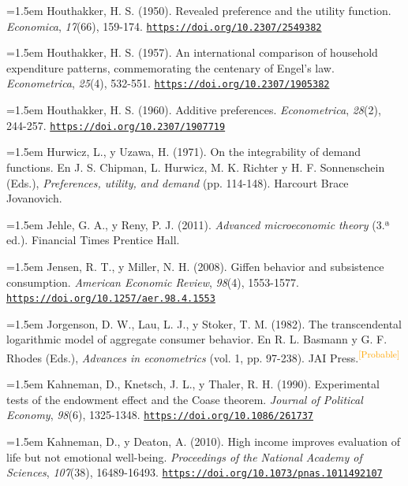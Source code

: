 \documentclass[10pt,a4paper]{article}
\begin{document}
\noindent\hangindent=1.5em Houthakker, H. S. (1950). Revealed preference and the utility function. \textit{Economica}, \textit{17}(66), 159-174. \href{https://doi.org/10.2307/2549382}{\nolinkurl{https://doi.org/10.2307/2549382}}

\noindent\hangindent=1.5em Houthakker, H. S. (1957). An international comparison of household expenditure patterns, commemorating the centenary of Engel's law. \textit{Econometrica}, \textit{25}(4), 532-551. \href{https://doi.org/10.2307/1905382}{\nolinkurl{https://doi.org/10.2307/1905382}}

\noindent\hangindent=1.5em Houthakker, H. S. (1960). Additive preferences. \textit{Econometrica}, \textit{28}(2), 244-257. \href{https://doi.org/10.2307/1907719}{\nolinkurl{https://doi.org/10.2307/1907719}}

\noindent\hangindent=1.5em Hurwicz, L., y Uzawa, H. (1971). On the integrability of demand functions. En J. S. Chipman, L. Hurwicz, M. K. Richter y H. F. Sonnenschein (Eds.), \textit{Preferences, utility, and demand} (pp. 114-148). Harcourt Brace Jovanovich.

\noindent\hangindent=1.5em Jehle, G. A., y Reny, P. J. (2011). \textit{Advanced microeconomic theory} (3.ª ed.). Financial Times Prentice Hall.

\noindent\hangindent=1.5em Jensen, R. T., y Miller, N. H. (2008). Giffen behavior and subsistence consumption. \textit{American Economic Review}, \textit{98}(4), 1553-1577. \href{https://doi.org/10.1257/aer.98.4.1553}{\nolinkurl{https://doi.org/10.1257/aer.98.4.1553}}

\noindent\hangindent=1.5em Jorgenson, D. W., Lau, L. J., y Stoker, T. M. (1982). The transcendental logarithmic model of aggregate consumer behavior. En R. L. Basmann y G. F. Rhodes (Eds.), \textit{Advances in econometrics} (vol. 1, pp. 97-238). JAI Press.\textcolor{orange}{\textsuperscript{[Probable]}}

\noindent\hangindent=1.5em Kahneman, D., Knetsch, J. L., y Thaler, R. H. (1990). Experimental tests of the endowment effect and the Coase theorem. \textit{Journal of Political Economy}, \textit{98}(6), 1325-1348. \href{https://doi.org/10.1086/261737}{\nolinkurl{https://doi.org/10.1086/261737}}

\noindent\hangindent=1.5em Kahneman, D., y Deaton, A. (2010). High income improves evaluation of life but not emotional well-being. \textit{Proceedings of the National Academy of Sciences}, \textit{107}(38), 16489-16493. \href{https://doi.org/10.1073/pnas.1011492107}{\nolinkurl{https://doi.org/10.1073/pnas.1011492107}}
\end{document}
